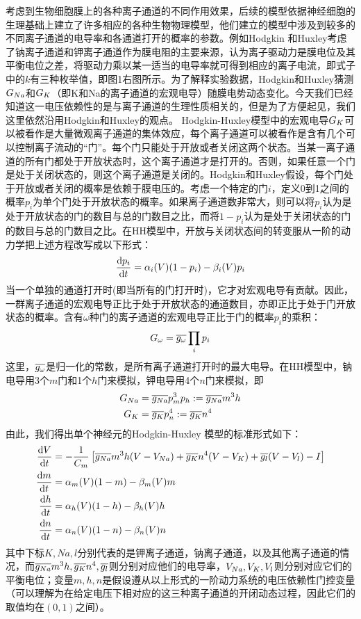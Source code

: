\documentclass[
bachelor,
nofont, %
pdflinks,
]{xjtuthesis}
\begin{document}
考虑到生物细胞膜上的各种离子通道的不同作用效果，后续的模型依据神经细胞的生理基础上建立了许多相应的各种生物物理模型，他们建立的模型中涉及到较多的不同离子通道的电导率和各通道打开的概率的参数。例如Hodgkin 和Huxley考虑了钠离子通道和钾离子通道作为膜电阻的主要来源，认为离子驱动力是膜电位及其平衡电位之差，将驱动力乘以某一适当的电导率就可得到相应的离子电流，即式子中的$k$有三种枚举值，即图1右图所示。为了解释实验数据，Hodgkin和Huxley猜测$G_{Na}$和$G_{K}$（即K和Na的离子通道的宏观电导）随膜电势动态变化。今天我们已经知道这一电压依赖性的是与离子通道的生理性质相关的，但是为了方便起见，我们这里依然沿用Hodgkin和Huxley的观点。 Hodgkin-Huxley模型中的宏观电导$G_{K}$可以被看作是大量微观离子通道的集体效应，每个离子通道可以被看作是含有几个可以控制离子流动的“门”。每个门只能处于开放或者关闭这两个状态。当某一离子通道的所有门都处于开放状态时，这个离子通道才是打开的。否则，如果任意一个门是处于关闭状态的，则这个离子通道是关闭的。Hodgkin和Huxley假设，每个门处于开放或者关闭的概率是依赖于膜电压的。考虑一个特定的门$i$，定义0到1之间的概率$p_i$为单个门处于开放状态的概率。如果离子通道数非常大，则可以将$p_i$认为是处于开放状态的门的数目与总的门数目之比，而将$1-p_i$认为是处于关闭状态的门的数目与总的门数目之比。在HH模型中，开放与关闭状态间的转变服从一阶的动力学把上述方程改写成以下形式：
\begin{align}
\frac{\mathrm d p_i}{\mathrm d t}= \alpha_i (V)(1-p_i)-\beta_i (V)p_i
\end{align}
当一个单独的通道打开时(即当所有的门打开时)，它才对宏观电导有贡献。因此，一群离子通道的宏观电导正比于处于开放状态的通道数目，亦即正比于处于门开放状态的概率。含有$\omega$种门的离子通道的宏观电导正比于门的概率$p_i$的乘积：
\begin{align}
G_{\omega} = \overline{g_{\omega}} \prod_i p_i
\end{align}
这里，$\overline{g_{\omega}}$是归一化的常数，是所有离子通道打开时的最大电导。在HH模型中，钠电导用3个$m$门和1个$h$门来模拟，钾电导用4个$n$门来模拟，即
\begin{align}
G_{Na} &= \overline{g_{Na}} p_m^3p_h:= \overline{g_{Na}} m^3h\\
G_{K} &= \overline{g_{K}} p_n^4:= \overline{g_{K}} n^4
\end{align}
由此，我们得出单个神经元的Hodgkin-Huxley 模型的标准形式如下：
\begin{align}
\notag \frac{\mathrm d V}{\mathrm d t} &= - \dfrac{1}{C_m} \left[ \overline{g_{Na}} m^3h(V-V_{Na})+ \overline{g_{K}} n^4(V-V_{K})+\overline{g_l}(V-V_{l}) - I \right] \\
\frac{\mathrm d m}{\mathrm d t} &= \alpha_m (V)(1-m)-\beta_m (V)m \\
\notag \frac{\mathrm d h}{\mathrm d t} &= \alpha_h (V)(1-h)-\beta_h (V)h \\
\notag \frac{\mathrm d n}{\mathrm d t} &= \alpha_n (V)(1-n)-\beta_n (V)n 
\end{align}
其中下标$K,Na,l$分别代表的是钾离子通道，钠离子通道，以及其他离子通道的情况，而$\overline{g_{Na}} m^3h,\overline{g_{K}} n^4, \overline{g_l}$则分别对应他们的电导率，$V_{Na}, V_{K}, V_{l}$则分别对应它们的平衡电位；变量$m,h,n$是假设遵从以上形式的一阶动力系统的电压依赖性门控变量（可以理解为在给定电压下相对应的这三种离子通道的开闭动态过程，因此它们的取值均在$(0,1)$之间）。
\end{document}
